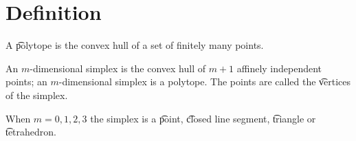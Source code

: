 
\section*{Definition}

A \t{polytope} is the convex hull of a set of finitely many points.

An \t{$m$-dimensional simplex} is the convex hull of $m+1$ affinely independent points; an $m$-dimensional simplex is a polytope.
The points are called the \t{vertices} of the simplex.

When $m = 0, 1, 2, 3$ the simplex is a \t{point}, \t{closed line segment}, \t{triangle} or \t{tetrahedron}.

\blankpage